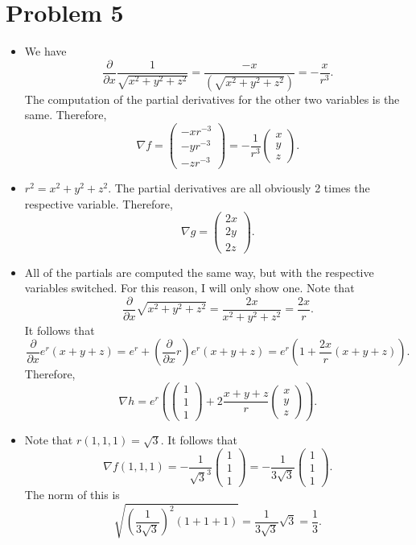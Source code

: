\documentclass[11pt, letterpaper]{article}
\begin{document}
\section*{Problem 5}
\begin{itemize}
	\item We have
		\[
			\frac{\partial }{\partial x} \frac{1}{\sqrt{x^2+y^2+z^2} } =\frac{-x}{\left( \sqrt{x^2+y^2+z^2}  \right) } =-\frac{x}{r^3} 
		.\]
		The computation of the partial derivatives for the other two variables is the same. Therefore,
		\[
			\nabla f=\begin{pmatrix}
			-xr^{-3}  \\
			-yr^{-3}  \\
			-zr^{-3} 
			\end{pmatrix}=-\frac{1}{r^3} \begin{pmatrix}
			x \\
			y \\
			z
			\end{pmatrix}
		.\]
	\item $r^2=x^2+y^2+z^2$. The partial derivatives are all obviously 2 times the respective variable. Therefore,
		\[
			\nabla g=\begin{pmatrix}
			2x \\
			2y \\
			2z
			\end{pmatrix}
		.\]
	\item All of the partials are computed the same way, but with the respective variables switched. For this reason, I will only show one. Note that
		\[
			\frac{\partial }{\partial x} \sqrt{x^2+y^2+z^2} =\frac{2x}{x^2+y^2+z^2} =\frac{2x}{r} 
		.\]
		It follows that 
		\[
			\frac{\partial }{\partial x} e^r(x+y+z)=e^r+\left( \frac{\partial }{\partial x} r \right) e^r(x+y+z)=e^r\left(1+\frac{2x}{r} (x+y+z)\right)
		.\]
		Therefore,
		\[
			\nabla h=e^r \left(\begin{pmatrix}
			1 \\
			1 \\
			1
			\end{pmatrix}+2\frac{x+y+z}{r} \begin{pmatrix}
			x \\
			y \\
			z
			\end{pmatrix}\right)
		.\]
	\item Note that $r(1,1,1)=\sqrt{3} $. It follows that
		\[
			\nabla f(1,1,1)=-\frac{1}{\sqrt{3}^3 } \begin{pmatrix}
			1 \\
			1 \\
			1
			\end{pmatrix}=-\frac{1}{3\sqrt{3} } \begin{pmatrix}
			1 \\
			1 \\
			1
			\end{pmatrix}
		.\]
		The norm of this is
		\[
			\sqrt{\left( \frac{1}{3\sqrt{3} }  \right)^2\left( 1+1+1 \right) }=\frac{1}{3\sqrt{3} } \sqrt{3} =\frac{1}{3} 
		.\]
\end{itemize}
\end{document}
